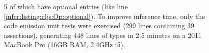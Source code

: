 \begin{figure}
{         5 of which have optional entries (like line \ref{infer:listing:cljs:Op:optional}).
         To improve inference time,
         only the code emission unit tests were exercised (299 lines containing 39 assertions),
         generating 448 lines of types %
         in 2.5 minutes on a 2011 MacBook Pro (16GB RAM, 2.4GHz i5).
}
\label{infer:fig:cljs}

\end{figure}
